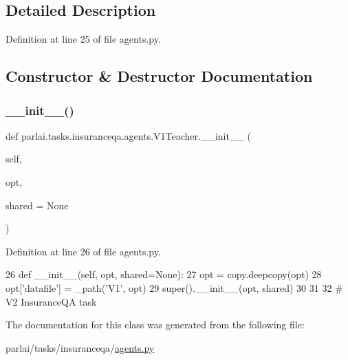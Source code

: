 \subsection{Detailed Description}


Definition at line 25 of file agents.\+py.



\subsection{Constructor \& Destructor Documentation}
\mbox{\label{classparlai_1_1tasks_1_1insuranceqa_1_1agents_1_1V1Teacher_aa41a7ca1c1c437a0d1bb4bf93549446a}} 
\subsubsection{\texorpdfstring{\+\_\+\+\_\+init\+\_\+\+\_\+()}{\_\_init\_\_()}}
{\footnotesize\ttfamily def parlai.\+tasks.\+insuranceqa.\+agents.\+V1\+Teacher.\+\_\+\+\_\+init\+\_\+\+\_\+ (\begin{DoxyParamCaption}\item[{}]{self,  }\item[{}]{opt,  }\item[{}]{shared = {\ttfamily None} }\end{DoxyParamCaption})}



Definition at line 26 of file agents.\+py.


\begin{DoxyCode}
26     \textcolor{keyword}{def }\_\_init\_\_(self, opt, shared=None):
27         opt = copy.deepcopy(opt)
28         opt[\textcolor{stringliteral}{'datafile'}] = \_path(\textcolor{stringliteral}{'V1'}, opt)
29         super().\_\_init\_\_(opt, shared)
30 
31 
32 \textcolor{comment}{# V2 InsuranceQA task}
\end{DoxyCode}


The documentation for this class was generated from the following file\+:\begin{DoxyCompactItemize}
\item 
parlai/tasks/insuranceqa/\hyperlink{parlai_2tasks_2insuranceqa_2agents_8py}{agents.\+py}\end{DoxyCompactItemize}
